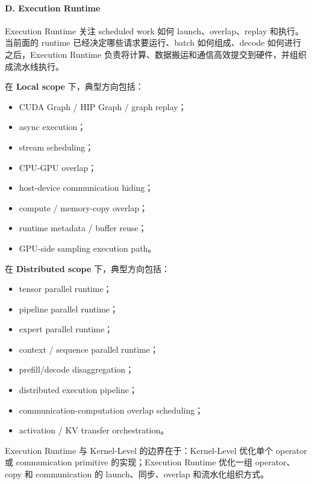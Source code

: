 \documentclass[a4paper,10pt]{ctexart}
\begin{document}
\paragraph*{D. Execution Runtime}

Execution Runtime 关注 scheduled work 如何 launch、overlap、replay 和执行。当前面的 runtime 已经决定哪些请求要运行、batch 如何组成、decode 如何进行之后，Execution Runtime 负责将计算、数据搬运和通信高效提交到硬件，并组织成流水线执行。


在 \textbf{Local scope} 下，典型方向包括：


\begin{itemize}
\item CUDA Graph / HIP Graph / graph replay；

\item async execution；

\item stream scheduling；

\item CPU-GPU overlap；

\item host-device communication hiding；

\item compute / memory-copy overlap；

\item runtime metadata / buffer reuse；

\item GPU-side sampling execution path。

\end{itemize}
在 \textbf{Distributed scope} 下，典型方向包括：


\begin{itemize}
\item tensor parallel runtime；

\item pipeline parallel runtime；

\item expert parallel runtime；

\item context / sequence parallel runtime；

\item prefill/decode disaggregation；

\item distributed execution pipeline；

\item communication-computation overlap scheduling；

\item activation / KV transfer orchestration。

\end{itemize}
Execution Runtime 与 Kernel-Level 的边界在于：Kernel-Level 优化单个 operator 或 communication primitive 的实现；Execution Runtime 优化一组 operator、copy 和 communication 的 launch、同步、overlap 和流水化组织方式。
\end{document}
